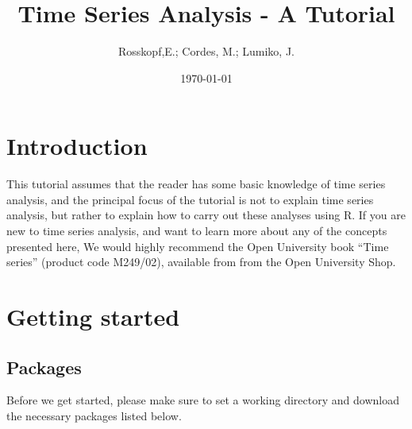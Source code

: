 \documentclass[11pt, a4paper]{article} %
\begin{document}

\title{Time Series Analysis - A Tutorial}
\author{Rosskopf,E.; Cordes, M.; Lumiko, J.}
\date{\today} %
\maketitle
{}
\tableofcontents
\pagebreak
\section{Introduction}%
This tutorial assumes that the reader has some basic knowledge of time series analysis, and the principal focus of the tutorial is not to explain time series analysis, but rather to explain how to carry out these analyses using R.
\noindent 
If you are new to time series analysis, and want to learn more about any of the concepts presented here, We would highly recommend the Open University book “Time series” (product code M249/02), available from from the Open University Shop.



\section{Getting started}%
\subsection{Packages}
Before we get started, please make sure to set a working directory and download the necessary packages listed below.\\
\end{document}
